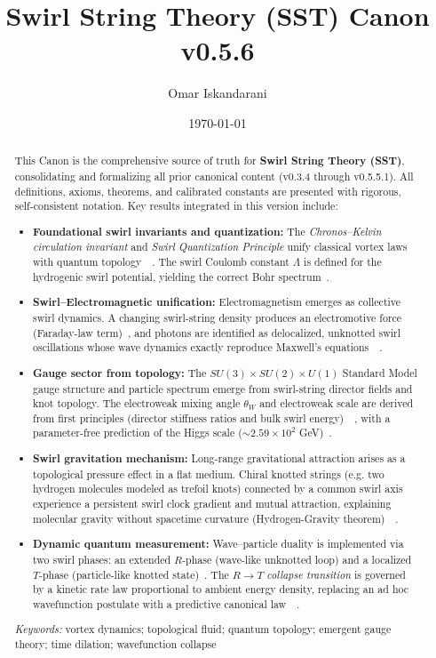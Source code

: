 \documentclass[aps,onecolumn,10pt,nofootinbib]{revtex4}
\begin{document}
	\title{Swirl String Theory (SST) Canon v0.5.6}
	\author{Omar Iskandarani}
	\date{\today}
	\begin{abstract}
		This Canon is the comprehensive source of truth for \textbf{Swirl String Theory (SST)}, consolidating and formalizing all prior canonical content (v0.3.4 through v0.5.5.1). All definitions, axioms, theorems, and calibrated constants are presented with rigorous, self-consistent notation. Key results integrated in this version include:

		\begin{itemize}
			\item \textbf{Foundational swirl invariants and quantization:} The \emph{Chronos–Kelvin circulation invariant} and \emph{Swirl Quantization Principle} unify classical vortex laws with quantum topology~\cite{index=0}~\cite{index1}. The swirl Coulomb constant $\Lambda$ is defined for the hydrogenic swirl potential, yielding the correct Bohr spectrum~\cite{index2}.
			\item \textbf{Swirl–Electromagnetic unification:} Electromagnetism emerges as collective swirl dynamics. A changing swirl-string density produces an electromotive force (Faraday-law term)~\cite{index3}, and photons are identified as delocalized, unknotted swirl oscillations whose wave dynamics exactly reproduce Maxwell’s equations~\cite{index4}~\cite{index5}.
			\item \textbf{Gauge sector from topology:} The $SU(3)\times SU(2)\times U(1)$ Standard Model gauge structure and particle spectrum emerge from swirl-string director fields and knot topology. The electroweak mixing angle $\theta_W$ and electroweak scale are derived from first principles (director stiffness ratios and bulk swirl energy)~\cite{index6}~\cite{index7}, with a parameter-free prediction of the Higgs scale ($\sim\!2.59\times10^2$ GeV)~\cite{index8}.
			\item \textbf{Swirl gravitation mechanism:} Long-range gravitational attraction arises as a topological pressure effect in a flat medium. Chiral knotted strings (e.g. two hydrogen molecules modeled as trefoil knots) connected by a common swirl axis experience a persistent swirl clock gradient and mutual attraction, explaining molecular gravity without spacetime curvature (Hydrogen-Gravity theorem)~\cite{index9}~\cite{index10}.
			\item \textbf{Dynamic quantum measurement:} Wave–particle duality is implemented via two swirl phases: an extended $R$-phase (wave-like unknotted loop) and a localized $T$-phase (particle-like knotted state)~\cite{index11}. The $R\to T$ \emph{collapse transition} is governed by a kinetic rate law proportional to ambient energy density, replacing an ad hoc wavefunction postulate with a predictive canonical law~\cite{index12}~\cite{index13}.
		\end{itemize}

		\vspace{1ex}\noindent
		\emph{Keywords:} vortex dynamics; topological fluid; quantum topology; emergent gauge theory; time dilation; wavefunction collapse
	\end{abstract}
\end{document}
